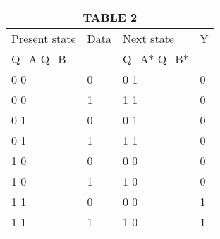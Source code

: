 \documentclass{article}
\begin{document}
\begin{tabular}{ |p{2cm}|p{1cm}|p{2cm}|p{1cm}| }
\hline
\multicolumn{4}{|c|}{TABLE 2} \\
\hline
Present state & Data & Next state & Y  \\
\hline

Q_A \hspace{1cm} Q_B &  & Q_A* \hspace{0.3cm} Q_B*  &  \\
\hline
0 \hspace{1cm} 0 & 0 & 0 \hspace{1cm} 1  & 0 \\
\hline
0 \hspace{1cm} 0 & 1 & 1 \hspace{1cm} 1  & 0 \\
\hline
0 \hspace{1cm} 1 & 0 & 0 \hspace{1cm} 1  & 0 \\
\hline
0 \hspace{1cm} 1 & 1 & 1 \hspace{1cm} 1  & 0 \\
\hline
1 \hspace{1cm} 0 & 0 & 0 \hspace{1cm} 0  & 0 \\
\hline
1 \hspace{1cm} 0 & 1 & 1 \hspace{1cm} 0  & 0 \\
\hline
1 \hspace{1cm} 1 & 0 & 0 \hspace{1cm} 0  & 1 \\
\hline
1 \hspace{1cm} 1 & 1 & 1 \hspace{1cm} 0  & 1 \\
\hline
\end{tabular}
\end{document}
